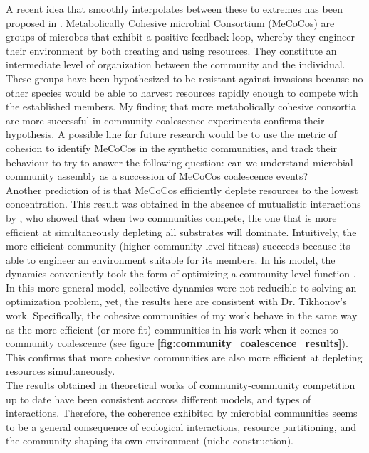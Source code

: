 \documentclass[titlepage,11pt]{article}
\begin{document}
\begin{linenumbers}
\begin{singlespace}
			A recent idea that smoothly interpolates between these to extremes has been proposed in \citep{Pascual-Garcia2020}. Metabolically Cohesive microbial Consortium (MeCoCos) are groups of microbes that exhibit a positive feedback loop, whereby they engineer their environment by both creating and using resources. They constitute an intermediate level of organization between the community and the individual. These groups have been hypothesized to be resistant against invasions because no other species would be able to harvest resources rapidly enough to compete with the established members. My finding that more metabolically cohesive consortia are more successful in community coalescence experiments confirms their hypothesis. A possible line for future research would be to use the metric of cohesion to identify MeCoCos in the synthetic communities, and track their behaviour to try to answer the following question:  can we understand  microbial community assembly as a succession of MeCoCos coalescence events?\\ 
			Another prediction of \citet{Pascual-Garcia2020} is that MeCoCos efficiently deplete resources to the lowest concentration. This result was obtained in the absence of mutualistic interactions by \citet{Tikhonov2016}, who showed that when two communities compete, the one that is more efficient at simultaneously depleting all substrates will dominate. Intuitively, the more efficient community (higher community-level fitness) succeeds because its able to engineer an environment suitable for its members. In his model, the dynamics conveniently took the form of optimizing a community level function \citep{Arthur1969}. In this more general model, collective dynamics were not reducible to solving an optimization problem, yet, the results here are consistent with Dr. Tikhonov's work. Specifically, the cohesive communities of my work behave in the same way as the more efficient (or more fit) communities in his work when it comes to community coalescence (see figure \textbf{\ref{fig:community_coalescence_results}}). This confirms that more cohesive communities are also more efficient at depleting resources simultaneously.\\
			The results obtained in theoretical works of community-community competition up to date have  been consistent accross different models, and types of interactions. Therefore, the coherence exhibited by microbial communities seems to be a general consequence of ecological interactions, resource partitioning, and the community shaping its own environment (niche construction).\\

\end{singlespace}
\end{linenumbers}
\end{document}

